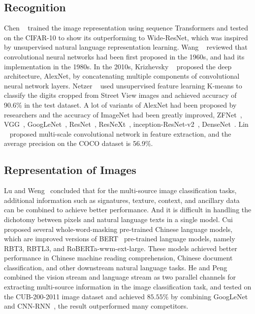 \documentclass[10pt,twocolumn,letterpaper]{article}
\begin{document}
\subsection{Recognition}

  Chen \etal~\cite{chen2020generative} trained the image representation using sequence Transformers and tested on the CIFAR-10 to show its outperforming to Wide-ResNet,
which was inspired by unsupervised natural language representation learning.
  Wang \etal~\cite{wang2019development} reviewed that convolutional neural networks had been first proposed in the 1960s, and had its implementation in the 1980s.
  In the 2010s, Krizhevsky \etal~\cite{krizhevsky2012imagenet} proposed the deep architecture, AlexNet, by concatenating multiple components of convolutional neural network layers.
  Netzer \etal~\cite{netzer2011reading} used unsupervised feature learning K-means to classify the digits cropped from Street View images and achieved accuracy of 90.6\% in the test dataset.
  A lot of variants of AlexNet had been proposed by researchers and the accuracy of ImageNet had been greatly improved, \eg ZFNet~\cite{zeiler2014visualizing}, VGG~\cite{simonyan2014very}, GoogLeNet~\cite{szegedy2015going}, ResNet~\cite{he2016deep},
  ResNeXt~\cite{xie2017aggregated}, inception-ResNet-v2~\cite{szegedy2016inception}, DenseNet~\cite{huang2016deep}.
  Lin \etal~\cite{lin2017feature} proposed multi-scale convolutional network in feature extraction, and the average precision on the COCO dataset is 56.9\%.

\subsection{Representation of Images}

  Lu and Weng~\cite{lu2007survey} concluded that for the multi-source image classification tasks, additional information such as signatures, texture, context, and ancillary data can be combined to achieve better performance.
And it is difficult in handling the dichotomy between pixels and natural language texts in a single model.
  Cui \etal~\cite{cui2020revisiting} proposed several whole-word-masking pre-trained Chinese language models,
which are improved versions of BERT~\cite{devlin2019bert} pre-trained language models, namely RBT3, RBTL3, and RoBERTa-wwm-ext-large.
These models achieved better performance in Chinese machine reading comprehension, Chinese document classification, and other downstream natural language tasks.
  He and Peng~\cite{he2017fine} combined the vision stream and language stream as two parallel channels for extracting multi-source information in the image classification task,
and tested on the CUB-200-2011 image dataset and achieved $85.55\%$ by combining GoogLeNet~\cite{szegedy2015going} and CNN-RNN~\cite{reed2016learning}, the result outperformed many competitors.
\end{document}
